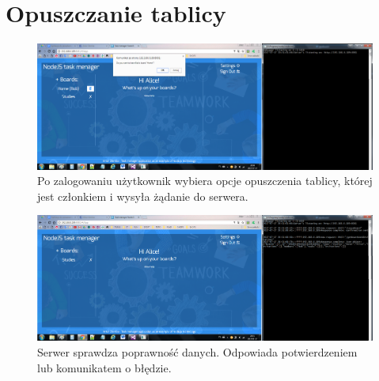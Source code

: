 \documentclass[12pt]{report}
\begin{document}
\section{Opuszczanie tablicy}
\begin{figure}[!hb]
\centering
\includegraphics[width=\textwidth,height=\textheight,keepaspectratio]{D1.png}
\captionsetup{labelformat=empty}
\caption[]{Po zalogowaniu użytkownik wybiera opcje opuszczenia tablicy, której jest członkiem i wysyła żądanie do serwera.}
\end{figure}
\begin{figure}[!hb]
\centering
\includegraphics[width=\textwidth,height=\textheight,keepaspectratio]{D2.png}
\captionsetup{labelformat=empty}
\caption[]{Serwer sprawdza poprawność danych. Odpowiada potwierdzeniem lub komunikatem o błędzie.}
\end{figure}
\end{document}
